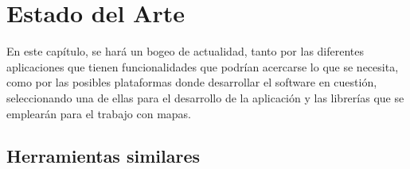 \chapter{Estado del Arte}\label{chapter:state-of-the-art}

En este capítulo, se hará un bogeo de actualidad, tanto por las diferentes aplicaciones que tienen funcionalidades
que podrían acercarse lo que se necesita, como por las posibles plataformas donde desarrollar el software en cuestión,
seleccionando una de ellas para el desarrollo de la aplicación y las librerías que se emplearán para el trabajo con mapas.

\section{Herramientas similares}






